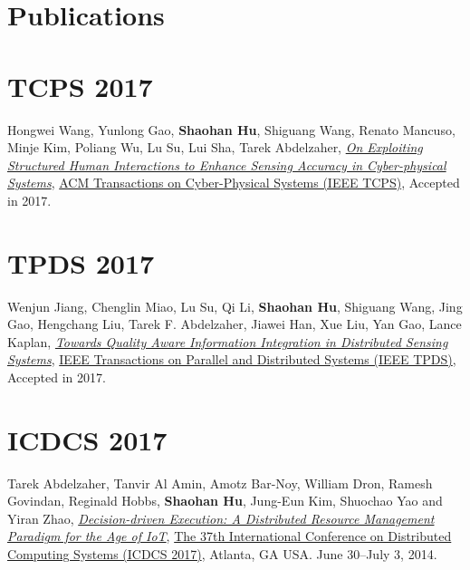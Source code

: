 
\section{\sc Publications}


\section{\sc TCPS 2017}\hypertarget{wang2017tcps}{}
Hongwei Wang, Yunlong Gao, \textbf{Shaohan Hu}, Shiguang Wang, Renato Mancuso, Minje Kim, Poliang Wu, Lu Su, Lui Sha, Tarek Abdelzaher,
\href{}{\emph{On Exploiting Structured Human Interactions to Enhance Sensing Accuracy in Cyber-physical Systems}},
\href{http://tcps.acm.org/}{\textsf{ACM Transactions on Cyber-Physical Systems (IEEE TCPS)}},
Accepted in 2017.

\section{\sc TPDS 2017}\hypertarget{su2017tpds}{}
Wenjun Jiang, Chenglin Miao, Lu Su, Qi Li, \textbf{Shaohan Hu}, Shiguang Wang, Jing Gao, Hengchang Liu, Tarek F. Abdelzaher, Jiawei Han, Xue Liu, Yan Gao, Lance Kaplan,
\href{}{\emph{Towards Quality Aware Information Integration in Distributed Sensing Systems}},
\href{https://www.computer.org/web/tpds}{\textsf{IEEE Transactions on Parallel and Distributed Systems (IEEE TPDS)}},
Accepted in 2017.

\section{\sc ICDCS 2017}\hypertarget{li2017abdelzaher}{}
Tarek Abdelzaher, Tanvir Al Amin, Amotz Bar-Noy, William Dron, Ramesh Govindan, Reginald Hobbs, \textbf{Shaohan Hu}, Jung-Eun Kim, Shuochao Yao and Yiran Zhao,
\href{}{\emph{Decision-driven Execution: A Distributed Resource Management Paradigm for the Age of IoT}},
\href{http://icdcs2017.gatech.edu/}{\textsf{The 37th International Conference on Distributed Computing Systems (ICDCS 2017)}},
Atlanta, GA USA. June 30--July 3, 2014.

